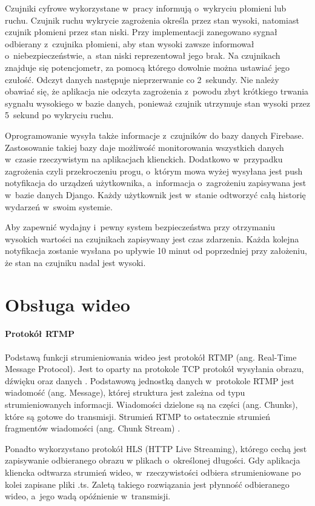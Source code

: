 Czujniki cyfrowe wykorzystane w~pracy informują o~wykryciu płomieni lub ruchu. Czujnik ruchu wykrycie zagrożenia określa przez stan wysoki, natomiast czujnik płomieni przez stan niski. Przy implementacji zanegowano sygnał odbierany z~czujnika płomieni, aby stan wysoki zawsze informował o~niebezpieczeństwie, a~stan niski reprezentował jego brak. Na czujnikach znajduje się potencjometr, za pomocą którego dowolnie można ustawiać jego czułość. Odczyt danych następuje nieprzerwanie co 2~sekundy. Nie należy obawiać się, że aplikacja nie odczyta zagrożenia z~powodu zbyt krótkiego trwania sygnału wysokiego w bazie danych, ponieważ czujnik utrzymuje stan wysoki przez 5~sekund po wykryciu ruchu. 

Oprogramowanie wysyła także informacje z~czujników do bazy danych Firebase. Zastosowanie takiej bazy daje możliwość monitorowania wszystkich danych w~czasie rzeczywistym na aplikacjach klienckich. Dodatkowo w~przypadku zagrożenia czyli przekroczeniu progu, o~którym mowa wyżej wysyłana jest push notyfikacja do urządzeń użytkownika, a~informacja o~zagrożeniu zapisywana jest w~bazie danych Django. Każdy użytkownik jest w~stanie odtworzyć całą historię wydarzeń w~swoim systemie.

Aby zapewnić wydajny i~pewny system bezpieczeństwa przy otrzymaniu wysokich wartości na czujnikach zapisywany jest czas zdarzenia. Każda kolejna notyfikacja zostanie wysłana po upływie 10 minut od poprzedniej przy założeniu, że stan na czujniku nadal jest wysoki. 

\section{Obsługa wideo}

\paragraph{Protokół RTMP}
Podstawą funkcji strumieniowania wideo jest protokół RTMP (ang. Real-Time Message Protocol). Jest to oparty na protokole TCP protokół wysyłania obrazu, dźwięku oraz danych \cite{MOBILERTMP}.
Podstawową jednostką danych w~protokole RTMP jest wiadomość (ang. Message), której struktura jest zależna od typu strumieniowanych informacji. 
Wiadomości dzielone są na części (ang. Chunks), które są gotowe do transmisji. Strumień RTMP to ostatecznie strumień fragmentów wiadomości (ang. Chunk Stream) \cite{STREAMRTMP}.

Ponadto wykorzystano protokół HLS (HTTP Live Streaming), którego cechą jest zapisywanie odbieranego obrazu w plikach o~określonej długości. Gdy aplikacja kliencka odtwarza strumień wideo, w~rzeczywistości odbiera strumieniowane po kolei zapisane pliki .ts. Zaletą takiego rozwiązania jest płynność odbieranego wideo, a~jego wadą opóźnienie w~transmisji.

